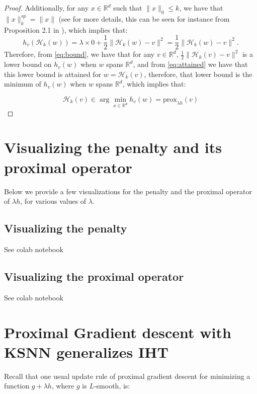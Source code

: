 \documentclass{article}
\begin{document}
\begin{proof}
Additionally, for any $x \in \mathbb{R}^d$ such that $\|x \|_0 \leq k$, we have that $\| x\|_{k}^{sp} = \| x\|$ (see \cite{argyriou2012sparse} for more details, this can be seen for instance from Proposition 2.1 in \cite{argyriou2012sparse}), which implies that: 
\begin{equation}\label{eq:attained}
 h_v(\mathcal{H}_k(w)) = \lambda \times 0 + \frac{1}{2} \| \mathcal{H}_k(w) - v \|^2 = \frac{1}{2} \| \mathcal{H}_k(w) - v \|^2.    
\end{equation} Therefore, from \eqref{eq:bound}, we have that for any $v \in \mathbb{R}^d$, $\frac{1}{2} \| \mathcal{H}_k(v) - v \|^2$ is a lower bound on $h_v(w)$ when $w$ spans $\mathbb{R}^d$, and from \eqref{eq:attained} we have that this lower bound is attained for $w = \mathcal{H}_k(v)$, therefore, that lower bound is the minimum of $h_v(w)$ when $w$ spans $\mathbb{R}^d$, which implies that:

$$\mathcal{H}_k(v) \in \arg\min_{x \in \mathbb{R}^d} h_v(w) = \text{prox}_{\lambda h}(v)$$



\end{proof}

\section{Visualizing the penalty and its proximal operator}

Below we provide a few visualizations for the penalty and the proximal operator of $\lambda h$, for various values of $\lambda$.

\subsection{Visualizing the penalty}


See colab notebook

\subsection{Visualizing the proximal operator}


See colab notebook


\section{Proximal Gradient descent with KSNN generalizes IHT}

Recall that one usual update rule of proximal gradient descent for minimizing a function $g + \lambda h$, where $g$ is $L$-smooth, is: 
\end{document}
